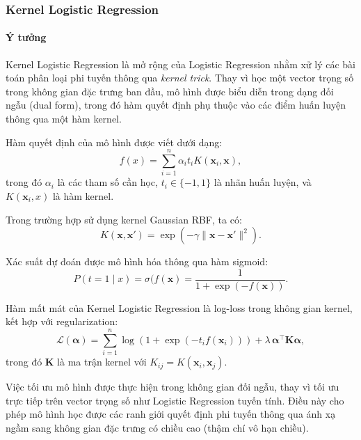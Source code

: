 \subsubsection{Kernel Logistic Regression}

\paragraph{Ý tưởng}
Kernel Logistic Regression là mở rộng của Logistic Regression nhằm
xử lý các bài toán phân loại phi tuyến thông qua \textit{kernel trick}.
Thay vì học một vector trọng số trong không gian đặc trưng ban đầu,
mô hình được biểu diễn trong dạng đối ngẫu (dual form), trong đó hàm
quyết định phụ thuộc vào các điểm huấn luyện thông qua một hàm kernel.

Hàm quyết định của mô hình được viết dưới dạng:
\begin{equation}
  f(x) = \sum_{i=1}^{n} \alpha_i t_i K(\boldsymbol{x}_i, \boldsymbol{x}),
\end{equation}
trong đó $\alpha_i$ là các tham số cần học, $t_i \in \{-1, 1\}$ là nhãn
huấn luyện, và $K(\boldsymbol{x}_i, x)$ là hàm kernel.

Trong trường hợp sử dụng kernel Gaussian RBF, ta có:
\begin{equation}
  K(\boldsymbol{x}, \boldsymbol{x'}) = \exp\left(-\gamma \|\boldsymbol{x} -
  \boldsymbol{x}'\|^2\right).
\end{equation}

Xác suất dự đoán được mô hình hóa thông qua hàm sigmoid:
\begin{equation}
  P(t=1 \mid x) = \sigma(f(\boldsymbol{x}) = \frac{1}{1 +
  \exp(-f(\boldsymbol{x}))}.
\end{equation}

Hàm mất mát của Kernel Logistic Regression là log-loss trong không
gian kernel, kết hợp với regularization:
\begin{equation}
  \mathcal{L}(\boldsymbol{\alpha})
  = \sum_{i=1}^{n}
  \log\left(1 + \exp\left(-t_i f(\boldsymbol{x}_i)\right)\right)
  + \lambda \, \boldsymbol{\alpha}^\intercal \boldsymbol{K}
  \boldsymbol{\alpha},
\end{equation}
trong đó $\boldsymbol{K}$ là ma trận kernel với
$K_{ij} = K(\boldsymbol{x}_i, \boldsymbol{x}_j)$.

Việc tối ưu mô hình được thực hiện trong không gian đối ngẫu, thay vì
tối ưu trực tiếp trên vector trọng số như Logistic Regression tuyến
tính. Điều này cho phép mô hình học được các ranh giới quyết định phi
tuyến thông qua ánh xạ ngầm sang không gian đặc trưng có chiều cao
(thậm chí vô hạn chiều).

